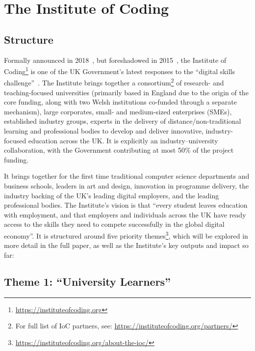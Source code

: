 \documentclass[conference]{IEEEtran}
\begin{document}
\section{The Institute of Coding}\label{ioc}

\subsection{Structure}

Formally announced in 2018~\cite{DfE2018a}, but foreshadowed in
2015~\cite{HMG2015a}, the Institute of
Coding\footnote{\url{https://instituteofcoding.org}} is one of the UK
Government's latest responses to the ``digital skills
challenge''~\cite{davenport-et-al:cep2019}. The Institute brings
together a consortium\footnote{For full list of IoC partners, see:
\url{https://instituteofcoding.org/partners/}} of research- and
teaching-focused universities (primarily based in England due to the
origin of the core funding, along with two Welsh institutions
co-funded through a separate mechanism), large corporates, small- and
medium-sized enterprises (SMEs), established industry groups, experts
in the delivery of distance/non-traditional learning and professional
bodies to develop and deliver innovative, industry-focused education
across the UK. It is explicitly an industry--university collaboration,
with the Government contributing at most 50\% of the project funding.

It brings together for the first time traditional computer science
departments and business schools, leaders in art and design,
innovation in programme delivery, the industry backing of the UK's
leading digital employers, and the leading professional bodies.  The
Institute's vision is that ``every student leaves education with
employment, and that employers and individuals across the UK have
ready access to the skills they need to compete successfully in the
global digital economy''. It is structured around five priority
themes\footnote{\url{https://instituteofcoding.org/about-the-ioc/}},
which will be explored in more detail in the full paper, as well as
the Institute's key outputs and impact so far:

\subsection*{Theme 1: ``University Learners''}
\end{document}
